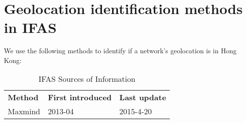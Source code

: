 \FloatBarrier

\section{Geolocation identification methods in IFAS}
We use the following methods to identify if a network's geolocation is in Hong Kong:
\begin{table}[!htbp]
\centering
\caption{IFAS Sources of Information}
\begin{tabular}{lll}
\hline
{\bf Method} & {\bf First introduced} & \bf Last update                                                                         \\\hhline{===}

Maxmind & 2013-04 & 2015-4-20
\\\hline
\end{tabular}
\end{table}
\newpage
